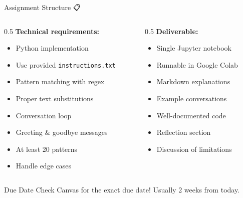 \documentclass[aspectratio=169]{beamer}
\begin{document}
\begin{frame}[shrink=10]{Assignment Structure 📋}
\small
\begin{columns}
\begin{column}{0.5\textwidth}
\textbf{Technical requirements:}
\begin{itemize}\setlength{\itemsep}{0pt}
    \item Python implementation
    \item Use provided \texttt{instructions.txt}
    \item Pattern matching with regex
    \item Proper text substitutions
    \item Conversation loop
    \item Greeting \& goodbye messages
    \item At least 20 patterns
    \item Handle edge cases
\end{itemize}
\end{column}

\begin{column}{0.5\textwidth}
\textbf{Deliverable:}
\begin{itemize}\setlength{\itemsep}{0pt}
    \item Single Jupyter notebook
    \item Runnable in Google Colab
    \item Markdown explanations
    \item Example conversations
    \item Well-documented code
    \item Reflection section
    \item Discussion of limitations
\end{itemize}
\end{column}
\end{columns}

\vspace{0.3cm}

\begin{block}{Due Date}
Check Canvas for the exact due date! Usually 2 weeks from today.
\end{block}
\end{frame}
\end{document}
